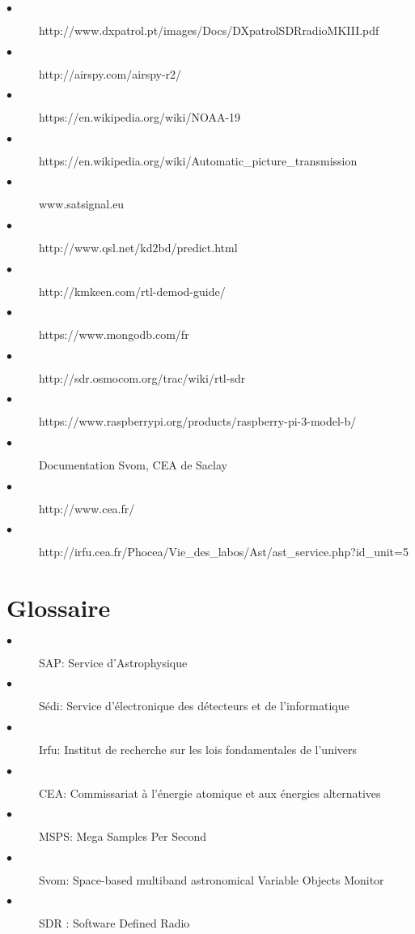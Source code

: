 \documentclass[12pt,fleqn]{book} %
\begin{document}
\begin{description}
\item[$\bullet$] http://www.dxpatrol.pt/images/Docs/DXpatrolSDRradioMKIII.pdf
\item[$\bullet$] http://airspy.com/airspy-r2/
\item[$\bullet$] https://en.wikipedia.org/wiki/NOAA-19
\item[$\bullet$] https://en.wikipedia.org/wiki/Automatic\_picture\_transmission
\item[$\bullet$] www.satsignal.eu
\item[$\bullet$] http://www.qsl.net/kd2bd/predict.html
\item[$\bullet$] http://kmkeen.com/rtl-demod-guide/
\item[$\bullet$] https://www.mongodb.com/fr
\item[$\bullet$] http://sdr.osmocom.org/trac/wiki/rtl-sdr
\item[$\bullet$] https://www.raspberrypi.org/products/raspberry-pi-3-model-b/
\item[$\bullet$] Documentation Svom, CEA de Saclay
\item[$\bullet$] http://www.cea.fr/
\item[$\bullet$] http://irfu.cea.fr/Phocea/Vie\_des\_labos/Ast/ast\_service.php?id\_unit=5
\end{description} 
\setcounter{part}{-7}

\part{Glossaire}
\begin{description}
 \item[$\bullet$] SAP: Service d'Astrophysique
 \item[$\bullet$] Sédi: Service d'électronique des détecteurs et de l'informatique
 \item[$\bullet$] Irfu: Institut de recherche sur les lois fondamentales de l'univers
 \item[$\bullet$] CEA: Commissariat à l'énergie atomique et aux énergies alternatives
 \item[$\bullet$] MSPS: Mega Samples Per Second
 \item[$\bullet$] Svom: Space-based multiband astronomical Variable Objects Monitor
 \item[$\bullet$] SDR : Software Defined Radio
\end{description}
\end{document}
